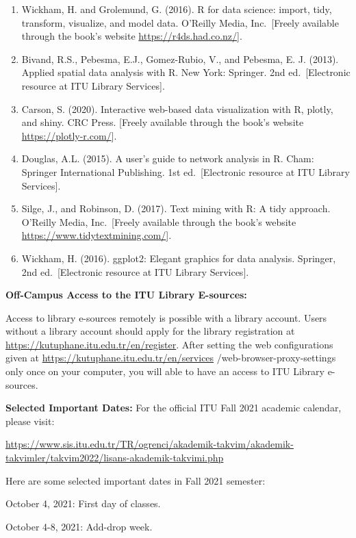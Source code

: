 \documentclass[
  12pt,
]{article}
\begin{document}
\begin{enumerate}
\def\labelenumi{\arabic{enumi}.}
\item
  Wickham, H. and Grolemund, G. (2016). R for data science: import,
  tidy, transform, visualize, and model data. O'Reilly Media,
  Inc.~{[}Freely available through the book's website
  \url{https://r4ds.had.co.nz/}{]}.
\item
  Bivand, R.S., Pebesma, E.J., Gomez-Rubio, V., and Pebesma, E. J.
  (2013). Applied spatial data analysis with R. New York: Springer. 2nd
  ed.~{[}Electronic resource at ITU Library Services{]}.
\item
  Carson, S. (2020). Interactive web-based data visualization with R,
  plotly, and shiny. CRC Press. {[}Freely available through the book's
  website \url{https://plotly-r.com/}{]}.
\item
  Douglas, A.L. (2015). A user's guide to network analysis in R. Cham:
  Springer International Publishing. 1st ed.~{[}Electronic resource at
  ITU Library Services{]}.
\item
  Silge, J., and Robinson, D. (2017). Text mining with R: A tidy
  approach. O'Reilly Media, Inc.~{[}Freely available through the book's
  website \url{https://www.tidytextmining.com/}{]}.
\item
  Wickham, H. (2016). ggplot2: Elegant graphics for data analysis.
  Springer, 2nd ed.~{[}Electronic resource at ITU Library Services{]}.
\end{enumerate}

\textbf{Off-Campus Access to the ITU Library E-sources:}

Access to library e-sources remotely is possible with a library account.
Users without a library account should apply for the library
registration at \url{https://kutuphane.itu.edu.tr/en/register}. After
setting the web configurations given at
\url{https://kutuphane.itu.edu.tr/en/services}
/web-browser-proxy-settings only once on your computer, you will able to
have an access to ITU Library e-sources.

\textbf{Selected Important Dates:} For the official ITU Fall 2021
academic calendar, please visit:

\url{https://www.sis.itu.edu.tr/TR/ogrenci/akademik-takvim/akademik-takvimler/takvim2022/lisans-akademik-takvimi.php}

Here are some selected important dates in Fall 2021 semester:

October 4, 2021: First day of classes.

October 4-8, 2021: Add-drop week.
\end{document}
